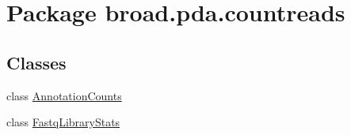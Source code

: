\hypertarget{namespacebroad_1_1pda_1_1countreads}{\section{Package broad.\+pda.\+countreads}
\label{namespacebroad_1_1pda_1_1countreads}
}
\subsection*{Classes}
\begin{DoxyCompactItemize}
\item 
class \hyperlink{classbroad_1_1pda_1_1countreads_1_1_annotation_counts}{Annotation\+Counts}
\item 
class \hyperlink{classbroad_1_1pda_1_1countreads_1_1_fastq_library_stats}{Fastq\+Library\+Stats}
\end{DoxyCompactItemize}
